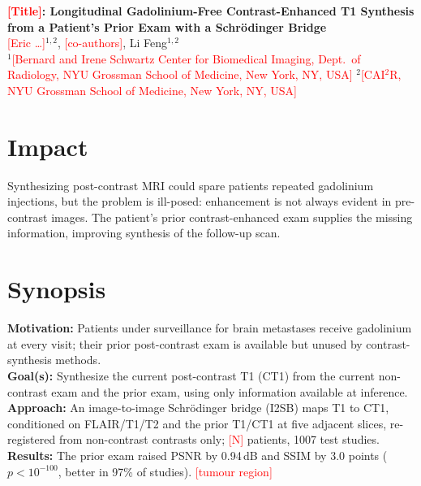 \documentclass[10pt]{article}
\newcommand{\todo}[1]{\textcolor{red}{[#1]}}
\begin{document}
\begin{center}
{\Large\bfseries \todo{Title}: Longitudinal Gadolinium-Free Contrast-Enhanced T1 Synthesis\\
from a Patient's Prior Exam with a Schr\"odinger Bridge}\\[6pt]
\todo{Eric \ldots}$^{1,2}$, \todo{co-authors}, Li Feng$^{1,2}$\\[2pt]
{\small $^1$\todo{Bernard and Irene Schwartz Center for Biomedical Imaging, Dept.\ of Radiology,
NYU Grossman School of Medicine, New York, NY, USA}\quad
$^2$\todo{CAI$^2$R, NYU Grossman School of Medicine, New York, NY, USA}}
\end{center}

\section*{Impact}
Synthesizing post-contrast MRI could spare patients repeated gadolinium injections, but the
problem is ill-posed: enhancement is not always evident in pre-contrast images. The patient's
prior contrast-enhanced exam supplies the missing information, improving synthesis of the
follow-up scan.

\section*{Synopsis}
\textbf{Motivation:} Patients under surveillance for brain metastases receive gadolinium at every
visit; their prior post-contrast exam is available but unused by contrast-synthesis methods.\\
\textbf{Goal(s):} Synthesize the current post-contrast T1 (CT1) from the current non-contrast
exam and the prior exam, using only information available at inference.\\
\textbf{Approach:} An image-to-image Schr\"odinger bridge (I2SB) maps T1 to CT1, conditioned on
FLAIR/T1/T2 and the prior T1/CT1 at five adjacent slices, re-registered from non-contrast
contrasts only; \todo{N} patients, 1007 test studies.\\
\textbf{Results:} The prior exam raised PSNR by 0.94\,dB and SSIM by 3.0 points ($p<10^{-100}$,
better in 97\% of studies). \todo{tumour region}

\end{document}
